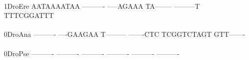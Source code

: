 \documentclass[11pt,twoside,reqno,a4paper]{article}
\begin{document}
{\hspace*{4\charwidth}\hspace*{7\charwidth}\hspace*{1\charwidth}\hspace*{1\charwidth}\hspace*{1\charwidth}\hspace*{1\charwidth}\hspace*{1\charwidth}\hspace*{1\charwidth}\\
1\hspace*{3\charwidth}DroEre	AATAAAATAA	----------	-----AGAAA	TA--------	---------T	TTTCGGATTT	\\
\hspace*{4\charwidth}\hspace*{7\charwidth}\hspace*{1\charwidth}\hspace*{1\charwidth}\hspace*{1\charwidth}\hspace*{1\charwidth}\hspace*{1\charwidth}\hspace*{1\charwidth}\\
0\hspace*{3\charwidth}DroAna	----------	----GAAGAA	T---------	-------CTC	TCGGTCTAGT	GTT-------	\\
\hspace*{4\charwidth}\hspace*{7\charwidth}\hspace*{1\charwidth}\hspace*{1\charwidth}\hspace*{1\charwidth}\hspace*{1\charwidth}\hspace*{1\charwidth}\hspace*{1\charwidth}\\
0\hspace*{3\charwidth}DroPse	----------	----------	----------	----------	----------	----------	\\
\hspace*{4\charwidth}\hspace*{7\charwidth}\hspace*{1\charwidth}\hspace*{1\charwidth}\hspace*{1\charwidth}\hspace*{1\charwidth}\hspace*{1\charwidth}\hspace*{1\charwidth}\\
}
\end{document}
